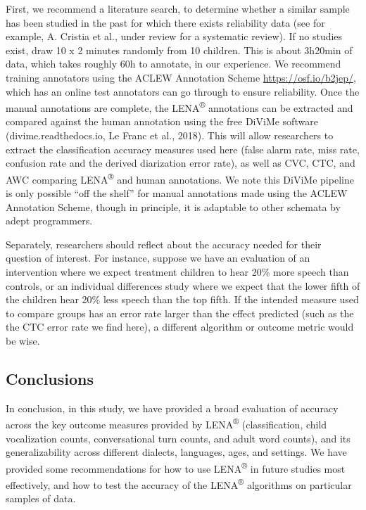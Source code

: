 \documentclass[english,floatsintext,man]{apa6}
\begin{document}
First, we recommend a literature search, to determine whether a similar
sample has been studied in the past for which there exists reliability
data (see for example, A. Cristia et al., under review for a systematic
review). If no studies exist, draw 10 x 2 minutes randomly from 10
children. This is about 3h20min of data, which takes roughly 60h to
annotate, in our experience. We recommend training annotators using the
ACLEW Annotation Scheme \url{https://osf.io/b2jep/}, which has an online
test annotators can go through to ensure reliability. Once the manual
annotations are complete, the LENA\textsuperscript{®} annotations can be
extracted and compared against the human annotation using the free
DiViMe software (divime.readthedocs.io, Le Franc et al., 2018). This
will allow researchers to extract the classification accuracy measures
used here (false alarm rate, miss rate, confusion rate and the derived
diarization error rate), as well as CVC, CTC, and AWC comparing
LENA\textsuperscript{®} and human annotations. We note this DiViMe
pipeline is only possible \enquote{off the shelf} for manual annotations
made using the ACLEW Annotation Scheme, though in principle, it is
adaptable to other schemata by adept programmers.

Separately, researchers should reflect about the accuracy needed for
their question of interest. For instance, suppose we have an evaluation
of an intervention where we expect treatment children to hear 20\% more
speech than controls, or an individual differences study where we expect
that the lower fifth of the children hear 20\% less speech than the top
fifth. If the intended measure used to compare groups has an error rate
larger than the effect predicted (such as the the CTC error rate we find
here), a different algorithm or outcome metric would be wise.

\subsection{Conclusions}\label{conclusions}

In conclusion, in this study, we have provided a broad evaluation of
accuracy across the key outcome measures provided by
LENA\textsuperscript{®} (classification, child vocalization counts,
conversational turn counts, and adult word counts), and its
generalizability across different dialects, languages, ages, and
settings. We have provided some recommendations for how to use
LENA\textsuperscript{®} in future studies most effectively, and how to
test the accuracy of the LENA\textsuperscript{®} algorithms on
particular samples of data.
\end{document}
